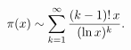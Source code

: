 \[\mathop{\pi\/}\nolimits\!\left(x\right)\sim\sum_{k=1}^{\infty}\frac{(k-1)!\,x}%
{(\mathop{\ln\/}\nolimits x)^{k}}.\]